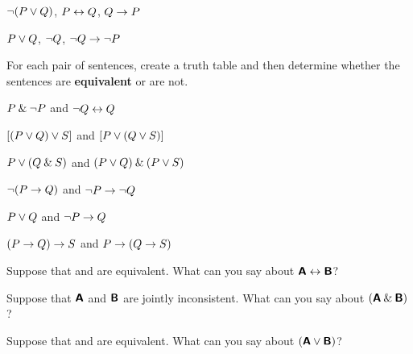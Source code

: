 \begin{small}
\begin{earg}
\item ${\neg}(P \vee Q)$, $P \leftrightarrow Q$, $Q \rightarrow P$\vspace{.5ex} %
\item $P \vee Q$, ${\neg} Q$, ${\neg} Q \rightarrow {\neg} P$\vspace{.5ex} %
\end{earg}


\problempart
\label{pr.TT.equiv}
For each pair of sentences, create a truth table and then determine whether the sentences are \textbf{equivalent} or are not. 
\begin{earg}
\item $P \mathbin{\&} {\neg} P$ and ${\neg} Q \leftrightarrow Q$
\item $[(P \vee Q) \vee S]$ and $[P \vee (Q \vee S)]$
\item $P \vee (Q \mathbin{\&} S)$ and $(P \vee Q) \mathbin{\&} (P \vee S)$

\item ${\neg}(P \rightarrow Q)$ and ${\neg} P \rightarrow {\neg} Q$
\item $P \vee Q$ and ${\neg} P \rightarrow Q$
\item$(P \rightarrow Q) \rightarrow S$ and $P \rightarrow (Q \rightarrow S)$
\end{earg}


\problempart
\label{pr.TT.concepts}
\begin{earg}
\item Suppose that  and  are equivalent. What can you say about $\bm{\mathsf{A}}\leftrightarrow\bm{\mathsf{B}}$?

\item Suppose that $\bm{\mathsf{A}}$ and $\bm{\mathsf{B}}$ are jointly inconsistent. What can you say about $(\bm{\mathsf{A}}\mathbin{\&}\bm{\mathsf{B}})$?

\item Suppose that  and  are equivalent. What can you say about $(\bm{\mathsf{A}}\vee\bm{\mathsf{B}})$?


\end{earg}
\end{small}
